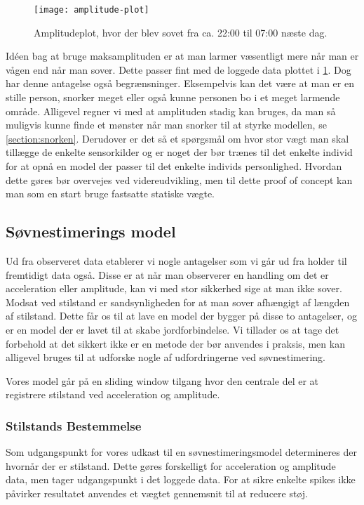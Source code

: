 \begin{figure}[h]
	\centering
	\texttt{[image: amplitude-plot]}
	\caption{Amplitudeplot, hvor der blev sovet fra ca. 22:00 til 07:00 næste dag.}\label{fig:amplplot}
\end{figure}

Idéen bag at bruge maksamplituden er at man larmer væsentligt mere når man er vågen end når man sover.
Dette passer fint med de loggede data plottet i \cref{fig:amplplot}.
Dog har denne antagelse også begrænsninger.
Eksempelvis kan det være at man er en stille person, snorker meget eller også kunne personen bo i et meget larmende område.
Alligevel regner vi med at amplituden stadig kan bruges, da man så muligvis kunne finde et mønster når man snorker til at styrke modellen, se \cref{section:snorken}.
Derudover er det så et spørgsmål om hvor stor vægt man skal tillægge de enkelte sensorkilder og er noget der bør trænes til det enkelte individ for at opnå en model der passer til det enkelte individs personlighed.
Hvordan dette gøres bør overvejes ved videreudvikling, men til dette proof of concept kan man som en start bruge fastsatte statiske vægte.

\subsection{Søvnestimerings model}
Ud fra observeret data etablerer vi nogle antagelser som vi går ud fra holder til fremtidigt data også.
Disse er at når man observerer en handling om det er acceleration eller amplitude, kan vi med stor sikkerhed sige at man ikke sover.
Modsat ved stilstand er sandsynligheden for at man sover afhængigt af længden af stilstand.
Dette får os til at lave en model der bygger på disse to antagelser, og er en model der er lavet til at skabe jordforbindelse.
Vi tillader os at tage det forbehold at det sikkert ikke er en metode der bør anvendes i praksis, men kan alligevel bruges til at udforske nogle af udfordringerne ved søvnestimering.

Vores model går på en sliding window tilgang hvor den centrale del er at registrere stilstand ved acceleration og amplitude.
\subsubsection{Stilstands Bestemmelse}
Som udgangspunkt for vores udkast til en søvnestimeringsmodel determineres der hvornår der er stilstand.
Dette gøres forskelligt for acceleration og amplitude data, men tager udgangspunkt i det loggede data.
For at sikre enkelte spikes ikke påvirker resultatet anvendes et vægtet gennemsnit til at reducere støj.


